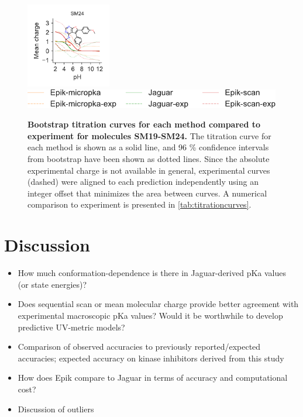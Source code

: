 \documentclass[9pt,lineno,final]{elife}
\begin{document}
\begin{figure}[H]
	\includegraphics[width=0.33\textwidth]{Reports/SM24-titrationcurve-views.pdf}	 \\
    \includegraphics[]{Reports/overview-legend.pdf}

	\caption{{\bf Bootstrap titration curves for each method compared to experiment for molecules SM19-SM24.} The titration curve for each method is shown as a solid line, and 96 \% confidence intervals from bootstrap have been shown as dotted lines. Since the absolute experimental charge is not available in general, experimental curves (dashed) were aligned to each prediction independently using an integer offset that minimizes the area between curves. A numerical comparison to experiment is presented in \cref{tab:titrationcurves}.
	\label{fig:charge-curves3}}
	

\end{figure}

\section{Discussion}


\begin{itemize}
	\item How much conformation-dependence is there in Jaguar-derived pKa values (or state energies)?
	\item Does sequential scan or mean molecular charge provide better agreement with experimental macroscopic pKa values? Would it be worthwhile to develop predictive UV-metric models?
	\item Comparison of observed accuracies to previously reported/expected accuracies; expected accuracy on kinase inhibitors derived from this study
	\item How does Epik compare to Jaguar in terms of accuracy and computational cost?
	\item Discussion of outliers
\end{itemize}
\end{document}
